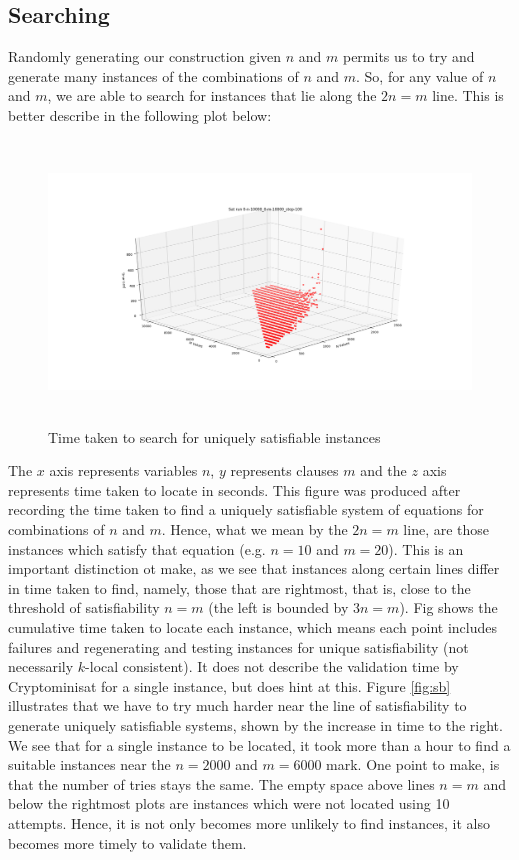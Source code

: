 \subsection{Searching}
Randomly generating our construction given $n$ and $m$ permits us to try and generate many instances of the combinations of $n$ and $m$. So, for any value of $n$ and $m$, we are able to search for instances that lie along the $2n=m$ line. This is better describe in the following plot below:
\par
\begin{figure}[h] 
	\centering
	\includegraphics[height=75mm]{Figs/system_search_time}
	\caption{Time taken to search for uniquely satisfiable instances}
	\label{fig:sa}
\end{figure}
The $x$ axis represents variables $n$, $y$ represents clauses $m$ and the $z$ axis represents time taken to locate in seconds. This figure was produced after recording the time taken to find a uniquely satisfiable system of equations for combinations of $n$ and $m$. Hence, what we mean by the $2n=m$ line, are those instances which satisfy that equation (e.g. $n=10$ and $m=20$). This is an important distinction ot make, as we see that instances along certain lines differ in time taken to find, namely, those that are rightmost, that is, close to the threshold of satisfiability $n=m$ (the left is bounded by $3n=m$). Fig shows the cumulative time taken to locate each instance, which means each point includes failures and regenerating and testing instances for unique satisfiability (not necessarily $k$-local consistent). It does not describe the validation time by Cryptominisat for a single instance, but does hint at this. Figure \ref{fig:sb} illustrates that we have to try much harder near the line of satisfiability to generate uniquely satisfiable systems, shown by the increase in time to the right. We see that for a single instance to be located, it took more than a hour to find a suitable instances near the $n=2000$ and $m=6000$ mark. One point to make, is that the number of tries stays the same. The empty space above lines $n=m$ and below the rightmost plots are instances which were not located using 10 attempts. Hence, it is not only becomes more unlikely to find instances, it also becomes more timely to validate them.
